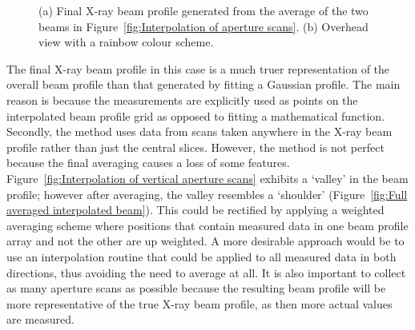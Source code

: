 \begin{figure}
\begin{subfigure}[b]{0.75\textwidth}
            \caption{}
            \label{fig:Overhead averaged interpolated interpolated beam}
    \end{subfigure}
    \caption[Final averaged X-ray beam profile used for the SAXS experiments.]{(a) Final X-ray beam profile generated from the average of the two beams in Figure~\ref{fig:Interpolation of aperture scans}.
    (b) Overhead view with a rainbow colour scheme.}
    \label{fig:Averaged Beam Profile}
\end{figure}

The final X-ray beam profile in this case is a much truer representation of the overall beam profile than that generated by fitting a Gaussian profile.
The main reason is because the measurements are explicitly used as points on the interpolated beam profile grid as opposed to fitting a mathematical function.
Secondly, the method uses data from scans taken anywhere in the X-ray beam profile rather than just the central slices.
However, the method is not perfect because the final averaging causes a loss of some features.
Figure~\ref{fig:Interpolation of vertical aperture scans} exhibits a `valley' in the beam profile; however after averaging, the valley resembles a `shoulder' (Figure~\ref{fig:Full averaged interpolated beam}).
This could be rectified by applying a weighted averaging scheme where positions that contain measured data in one beam profile array and not the other are up weighted.
A more desirable approach would be to use an interpolation routine that could be applied to all measured data in both directions, thus avoiding the need to average at all.
It is also important to collect as many aperture scans as possible because the resulting beam profile will be more representative of the true X-ray beam profile, as then more actual values are measured.

